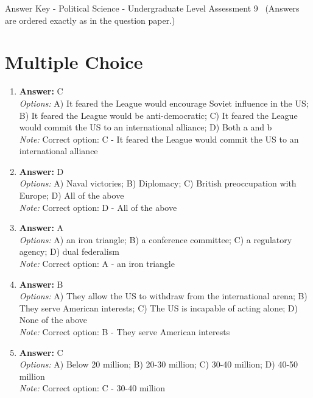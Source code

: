 \documentclass[12pt]{article}
\begin{document}
\begin{center}
Answer Key - Political Science - Undergraduate Level Assessment 9 \
\small (Answers are ordered exactly as in the question paper.)
\end{center}

\section*{Multiple Choice}
\begin{enumerate}[label=\arabic*.]
\item \textbf{Answer:} C
\\ \textit{Options:} A) It feared the League would encourage Soviet influence in the US; B) It feared the League would be anti-democratic; C) It feared the League would commit the US to an international alliance; D) Both a and b
\\ \textit{Note:} Correct option: C - It feared the League would commit the US to an international alliance
\item \textbf{Answer:} D
\\ \textit{Options:} A) Naval victories; B) Diplomacy; C) British preoccupation with Europe; D) All of the above
\\ \textit{Note:} Correct option: D - All of the above
\item \textbf{Answer:} A
\\ \textit{Options:} A) an iron triangle; B) a conference committee; C) a regulatory agency; D) dual federalism
\\ \textit{Note:} Correct option: A - an iron triangle
\item \textbf{Answer:} B
\\ \textit{Options:} A) They allow the US to withdraw from the international arena; B) They serve American interests; C) The US is incapable of acting alone; D) None of the above
\\ \textit{Note:} Correct option: B - They serve American interests
\item \textbf{Answer:} C
\\ \textit{Options:} A) Below 20 million; B) 20-30 million; C) 30-40 million; D) 40-50 million
\\ \textit{Note:} Correct option: C - 30-40 million
\end{enumerate}
\end{document}
